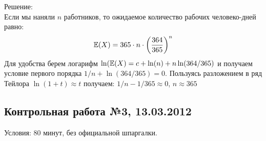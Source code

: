\documentclass[pdftex,12pt,a4paper]{article}
\begin{document}
Решение: \\

Если мы наняли $n$ работников, то ожидаемое количество рабочих человеко-дней равно:
\begin{equation}
\mathbb{E}(X)=365\cdot n\cdot \left(\frac{364}{365}\right)^{n}
\end{equation}
Для удобства берем логарифм $\ln(\mathbb{E}(X)=c+\ln(n)+n\ln(364/365)$ и получаем условие первого порядка $1/n+\ln(364/365)=0$. Пользуясь разложением в ряд Тейлора $\ln(1+t)\approx t$ получаем: $1/n-1/365\approx 0$, $n\approx 365$ 








\subsection{Контрольная работа №3, 13.03.2012}

Условия: 80 минут, без официальной шпаргалки.
\end{document}
